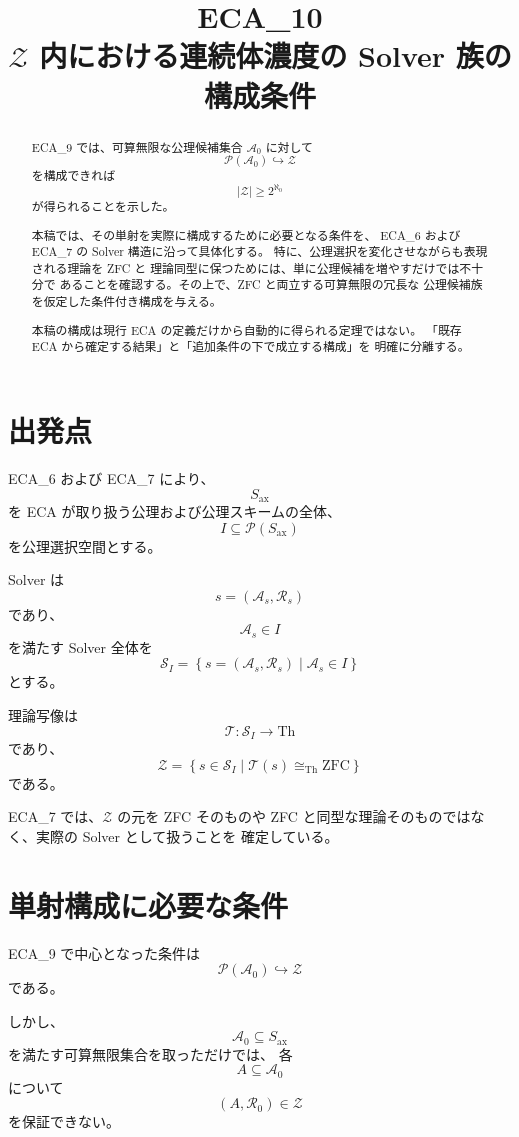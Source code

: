 \documentclass[a4paper,11pt]{jsarticle}
\title{ECA_10\\$\mathcal{Z}$ 内における連続体濃度の Solver 族の構成条件}
\author{}
\date{}
\newcommand{\Solver}{\mathcal{S}}
\newcommand{\Ax}{S_{\mathrm{ax}}}
\newcommand{\Th}{\mathrm{Th}}
\begin{document}
\maketitle

\begin{abstract}
ECA_9 では、可算無限な公理候補集合 $\mathcal{A}_0$ に対して
\[
\mathcal{P}(\mathcal{A}_0)\hookrightarrow\mathcal{Z}
\]
を構成できれば
\[
|\mathcal{Z}|\geq2^{\aleph_0}
\]
が得られることを示した。

本稿では、その単射を実際に構成するために必要となる条件を、
ECA_6 および ECA_7 の Solver 構造に沿って具体化する。
特に、公理選択を変化させながらも表現される理論を ZFC と
理論同型に保つためには、単に公理候補を増やすだけでは不十分で
あることを確認する。その上で、ZFC と両立する可算無限の冗長な
公理候補族を仮定した条件付き構成を与える。

本稿の構成は現行 ECA の定義だけから自動的に得られる定理ではない。
「既存 ECA から確定する結果」と「追加条件の下で成立する構成」を
明確に分離する。
\end{abstract}

\section{出発点}

ECA_6 および ECA_7 により、
\[
\Ax
\]
を ECA が取り扱う公理および公理スキームの全体、
\[
I\subseteq\mathcal{P}(\Ax)
\]
を公理選択空間とする。

Solver は
\[
s=(\mathcal{A}_s,\mathcal{R}_s)
\]
であり、
\[
\mathcal{A}_s\in I
\]
を満たす Solver 全体を
\[
\Solver_I=
\left\{
s=(\mathcal{A}_s,\mathcal{R}_s)\mid
\mathcal{A}_s\in I
\right\}
\]
とする。

理論写像は
\[
\mathcal{T}:\Solver_I\to\Th
\]
であり、
\[
\mathcal{Z}=
\left\{
s\in\Solver_I\mid
\mathcal{T}(s)\cong_{\mathrm{Th}}\mathrm{ZFC}
\right\}
\]
である。

ECA_7 では、$\mathcal{Z}$ の元を ZFC そのものや
ZFC と同型な理論そのものではなく、実際の Solver として扱うことを
確定している。

\section{単射構成に必要な条件}

ECA_9 で中心となった条件は
\[
\mathcal{P}(\mathcal{A}_0)\hookrightarrow\mathcal{Z}
\]
である。

しかし、
\[
\mathcal{A}_0\subseteq\Ax
\]
を満たす可算無限集合を取っただけでは、
各
\[
A\subseteq\mathcal{A}_0
\]
について
\[
(A,\mathcal{R}_0)\in\mathcal{Z}
\]
を保証できない。
\end{document}
